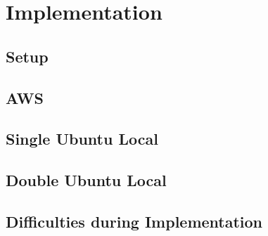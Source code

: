 \chapter{Implementation}

\section{Setup}

\section{AWS}

\section{Single Ubuntu Local}

\section{Double Ubuntu Local}


\section{Difficulties during Implementation}